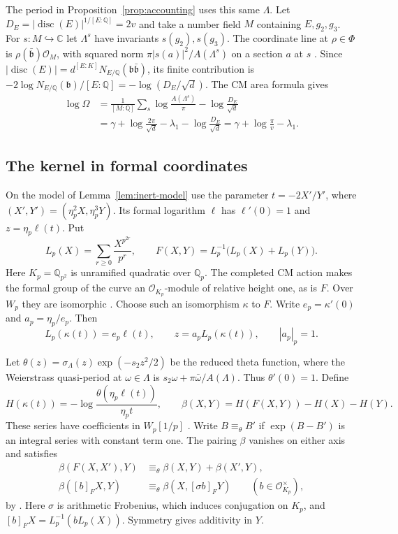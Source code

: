 The period in Proposition~\ref{prop:accounting} uses this same $\Lambda$.
Let $D_E=|\operatorname{disc}(E)|^{1/[E:\mathbb Q]}=2v$ and take a
number field $M$ containing $E,g_2,g_3$. For $s\colon M\hookrightarrow
\mathbb C$ let $\Lambda^s$ have invariants $s(g_2),s(g_3)$. The coordinate
line at $\rho\in\Phi$ is $\rho(\bar{\mathfrak b})\mathcal O_M$, with
squared norm $\pi|s(a)|^2/A(\Lambda^s)$ on a section $a$ at $s$
\citep[Lemma~15.4 and Definition~15.5]{adriazola-grh}.
Since $|\operatorname{disc}(E)|=d^{[E:K]}
N_{E/\mathbb Q}(\mathfrak b\bar{\mathfrak b})$, its finite contribution
is $-2\log N_{E/\mathbb Q}(\mathfrak b)/[E:\mathbb Q]
=-\log(D_E/\sqrt d)$. The CM area formula
\citep[Propositions~15.3 and~15.6]{adriazola-grh} gives
\begin{align*}
 \log\Omega
 &=\frac1{[M:\mathbb Q]}\sum_s\log\frac{A(\Lambda^s)}{\pi}
       -\log\frac{D_E}{\sqrt d}\\
 &=\gamma+\log\frac{2\pi}{\sqrt d}-\lambda_1
       -\log\frac{D_E}{\sqrt d}
  =\gamma+\log\frac{\pi}{v}-\lambda_1 .
\end{align*}

\subsection{The kernel in formal coordinates}

On the model of Lemma~\ref{lem:inert-model} use the parameter $t=-2X'/Y'$,
where $(X',Y')=(\eta_p^2X,\eta_p^3Y)$. Its formal logarithm $\ell$ has
$\ell'(0)=1$ and $z=\eta_p\ell(t)$. Put
\[
  L_p(X)=\sum_{r\ge0}\frac{X^{p^{2r}}}{p^r},\qquad
  F(X,Y)=L_p^{-1}\bigl(L_p(X)+L_p(Y)\bigr).
\]
Here $K_p=\mathbb Q_{p^2}$ is unramified quadratic over $\mathbb Q_p$.
The completed CM action makes the formal group of the curve an
$\mathcal O_{K_p}$-module of relative height one, as is $F$.
Over $W_p$ they are isomorphic
\citep[Propositions~1.7 and~4.2]{drinfeld-elliptic-modules}.
Choose such an isomorphism $\kappa$ to $F$. Write $e_p=\kappa'(0)$ and
$a_p=\eta_p/e_p$. Then
\begin{equation}\label{eq:inert-coordinate}
   L_p(\kappa(t))=e_p\ell(t),\qquad z=a_p L_p(\kappa(t)),\qquad
   |a_p|_p=1 .
\end{equation}

Let $\theta(z)=\sigma_\Lambda(z)\exp(-s_2z^2/2)$ be the reduced
theta function, where the Weierstrass quasi-period at
$\omega\in\Lambda$ is $s_2\omega+\pi\bar\omega/A(\Lambda)$.
Thus $\theta'(0)=1$. Define
\[
 H(\kappa(t))=-\log\frac{\theta(\eta_p\ell(t))}{\eta_p t},
 \qquad \beta(X,Y)=H(F(X,Y))-H(X)-H(Y).
\]
These series have coefficients in $W_p[1/p]$
\citep[\S\S8.2, 8.5]{adriazola-grh}. Write $B\equiv_\theta B'$ if
$\exp(B-B')$ is an integral series with constant term one.
The pairing $\beta$ vanishes on either axis and satisfies
\begin{align*}
 \beta(F(X,X'),Y)&\equiv_\theta\beta(X,Y)+\beta(X',Y),\\
 \beta([b]_F X,Y)&\equiv_\theta\beta(X,[\sigma b]_F Y)
        \qquad(b\in\mathcal O_{K_p}^\times),
\end{align*}
by \citep[Theorem~8.12]{adriazola-grh}. Here $\sigma$ is arithmetic
Frobenius, which induces conjugation on $K_p$, and
$[b]_F X=L_p^{-1}(bL_p(X))$. Symmetry gives additivity in $Y$.

